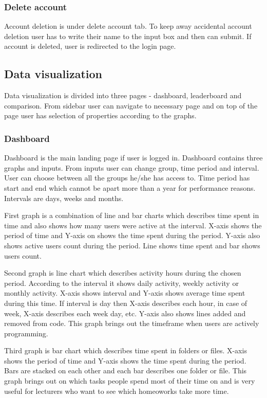 \subsubsection{Delete account}\label{subsubsec:delete-account}
Account deletion is under delete account tab.
To keep away accidental account deletion user has to write their name to the input box and then can submit.
If account is deleted, user is redirected to the login page.

\subsection{Data visualization}\label{subsec:data-visualization}
Data visualization is divided into three pages - dashboard, leaderboard and comparison.
From sidebar user can navigate to necessary page and on top of the page user has selection of properties according to the graphs.

\subsubsection{Dashboard}\label{subsubsec:dashboard}
Dashboard is the main landing page if user is logged in.
Dashboard contains three graphs and inputs.
From inputs user can change group, time period and interval.
User can choose between all the groups he/she has access to.
Time period has start and end which cannot be apart more than a year for performance reasons.
Intervals are days, weeks and months.

First graph is a combination of line and bar charts which describes time spent in time and also shows how many users were active at the interval.
X-axis shows the period of time and Y-axis on shows the time spent during the period.
Y-axis also shows active users count during the period.
Line shows time spent and bar shows users count.

Second graph is line chart which describes activity hours during the chosen period.
According to the interval it shows daily activity, weekly activity or monthly activity.
X-axis shows interval and Y-axis shows average time spent during this time.
If interval is day then X-axis describes each hour, in case of week, X-axis describes each week day, etc.
Y-axis also shows lines added and removed from code.
This graph brings out the timeframe when users are actively programming.

Third graph is bar chart which describes time spent in folders or files.
X-axis shows the period of time and Y-axis shows the time spent during the period.
Bars are stacked on each other and each bar describes one folder or file.
This graph brings out on which tasks people spend most of their time on and is very useful for lecturers who want to see which homeoworks take more time.

